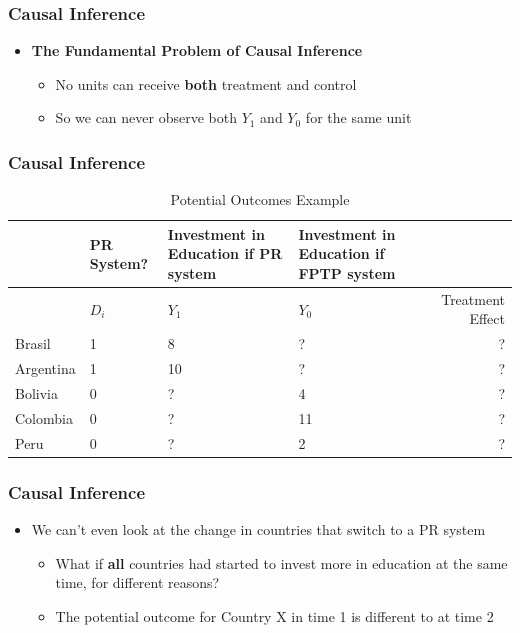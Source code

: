 \documentclass[xcolor=x11names,compress]{beamer}\usepackage[]{graphicx}\usepackage[]{color}
\renewcommand{\(}{\begin{columns}}
\renewcommand{\)}{\end{columns}}
\newcommand{\<}[1]{\begin{column}{#1}}
\renewcommand{\>}{\end{column}}
\begin{document}
\begin{frame}
\frametitle{Causal Inference}
\begin{itemize}
\item \textbf{The Fundamental Problem of Causal Inference}
\begin{itemize}
\item No units can receive \textbf{both} treatment and control
\item So we can never observe both $Y_1$ and $Y_0$ for the same unit
\end{itemize}
\end{itemize}
\end{frame}

\begin{frame}
\frametitle{Causal Inference}
\footnotesize
\begin{table}[htbp]
  \centering
  \caption{Potential Outcomes Example}
    \begin{tabular}{|p{1.8cm}|p{2.2cm}|p{2.2cm}|p{1.8cm}|r|}
    \hline
          & \multicolumn{1}{p{1.8cm}|}{PR System?} & \multicolumn{1}{p{2.2cm}|}{Investment in Education if PR system} & \multicolumn{1}{p{2.2cm}|}{Investment in Education if FPTP system} &  \bigstrut\\
    \hline
          & \multicolumn{1}{p{1.8cm}|}{$D_i$} & \multicolumn{1}{p{2.2cm}|}{$Y_1$} & \multicolumn{1}{p{2.2cm}|}{$Y_0$} & \multicolumn{1}{p{1.8cm}|}{Treatment Effect} \bigstrut\\
    \hline
    Brasil & 1 & 8     & ?      & ? \bigstrut\\
    \hline
    Argentina & 1 & 10    & ?      & ? \bigstrut\\
    \hline
    Bolivia & 0 & ?     & 4     & ? \bigstrut\\
    \hline
    Colombia & 0 &  ?   & 11    & ? \bigstrut\\
    \hline
    Peru & 0 & ?     & 2     & ? \bigstrut\\
    \hline
    \end{tabular}%
  \label{tab:addlabel}%
\end{table}%
\normalsize
\end{frame}

\begin{frame}
\frametitle{Causal Inference}
\begin{itemize}
\item We can't even look at the change in countries that switch to a PR system
\begin{itemize}
\item What if \textbf{all} countries had started to invest more in education at the same time, for different reasons?
\item The potential outcome for Country X in time 1 is different to at time 2
\end{itemize}
\end{itemize}
\end{frame}
\end{document}
